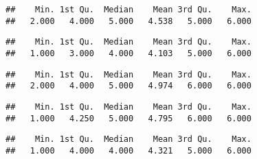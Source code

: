 \documentclass[]{article}
\newenvironment{Shaded}{\begin{snugshade}}{\end{snugshade}}
\newcommand{\KeywordTok}[1]{\textcolor[rgb]{0.13,0.29,0.53}{\textbf{#1}}}
\newcommand{\DecValTok}[1]{\textcolor[rgb]{0.00,0.00,0.81}{#1}}
\newcommand{\OperatorTok}[1]{\textcolor[rgb]{0.81,0.36,0.00}{\textbf{#1}}}
\newcommand{\NormalTok}[1]{#1}
\begin{document}
\begin{verbatim}
##    Min. 1st Qu.  Median    Mean 3rd Qu.    Max. 
##   2.000   4.000   5.000   4.538   5.000   6.000
\end{verbatim}

\begin{Shaded}
\end{Shaded}

\begin{verbatim}
##    Min. 1st Qu.  Median    Mean 3rd Qu.    Max. 
##   1.000   3.000   4.000   4.103   5.000   6.000
\end{verbatim}

\begin{Shaded}
\end{Shaded}

\begin{verbatim}
##    Min. 1st Qu.  Median    Mean 3rd Qu.    Max. 
##   2.000   4.000   5.000   4.974   6.000   6.000
\end{verbatim}

\begin{Shaded}
\end{Shaded}

\begin{verbatim}
##    Min. 1st Qu.  Median    Mean 3rd Qu.    Max. 
##   1.000   4.250   5.000   4.795   6.000   6.000
\end{verbatim}

\begin{Shaded}
\end{Shaded}

\begin{verbatim}
##    Min. 1st Qu.  Median    Mean 3rd Qu.    Max. 
##   1.000   4.000   4.000   4.321   5.000   6.000
\end{verbatim}
\end{document}
